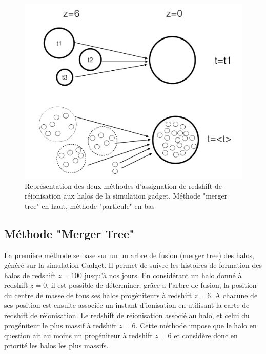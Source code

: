\clearpage

\begin{figure}
		\centering
        \includegraphics[width=.95\linewidth]{img/05/method.pdf} 
        \caption[Methodes]{Représentation des deux méthodes d'assignation de redshift de réionisation aux halos de la simulation gadget.
        Méthode "merger tree" en haut, méthode "particule" en bas
		\label{fig:methodes}}
\end{figure}


\subsection{Méthode "Merger Tree"}
La première méthode se base sur un un arbre de fusion (merger tree) des halos, généré sur la simulation Gadget.
Il permet de suivre les histoires de formation des halos de redshift $z=100$ jusqu'à nos jours.
En considérant un halo donné à redshift $z=0$, il est possible de déterminer, grâce a l'arbre de fusion, la position du centre de masse de tous ses halos progéniteurs à redshift $z=6$.
A chacune de ses position est ensuite associée un instant d'ionisation en utilisant la carte de redshift de réionisation.
Le redshift de réionisation associé au halo, et celui du progéniteur le plus massif à redshift $z=6$.
Cette méthode impose que le halo en question ait au moins un progéniteur à redshift $z=6$ et considère donc en priorité les halos les plus massifs.

